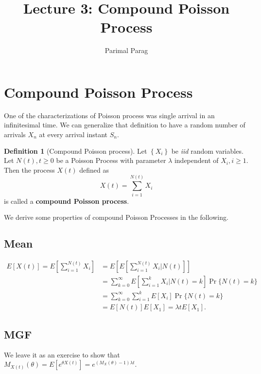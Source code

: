 \documentclass[a4paper,10pt]{article}
\date{}
\title{Lecture 3:  Compound Poisson Process}
\author{Parimal Parag}
\theoremstyle{plain}
\theoremstyle{definition}
\newtheorem{defn}[thm]{Definition}
\begin{document}
\maketitle

\section{Compound Poisson Process}
One of the characterizations of Poisson process was single arrival in an infinitesimal time. We can generalize that definition to have a random number of arrivals $X_n$ at every arrival instant $S_n$.
\begin{defn}[Compound Poisson process] Let $\left\{X_i\right\}$ be \emph{iid} random variables. Let $N(t), t\geq 0$ be a Poisson Process with parameter $\lambda$ independent of $X_i, i\geq 1$. Then the process $X(t)$ defined as
\begin{equation*}
X(t) = \sum_{i=1}^{N(t)} X_i
\end{equation*}
is called a \textbf{compound Poisson process}.
\end{defn}
We derive some properties of compound Poisson Processes in the following.
\subsection{Mean}
\begin{align*}
E[X(t)] = E[\sum_{i=1}^{N(t)} X_i] &= E[E[\sum_{i=1}^{N(t)} X_i|N(t)]] \\
&= \sum_{k=0}^\infty E\left[\sum_{i=1}^{k} X_i|N(t)=k\right]\Pr\{N(t) = k\}\\
&= \sum_{k=0}^\infty \sum_{i=1}^{k} E[X_i]\Pr\{N(t) = k\}\\
&= E[N(t)]E[X_1] = \lambda tE[X_1].
\end{align*}

\subsection{MGF}
We leave it as an exercise to show that $M_{X(t)}(\theta)=E[e^{\theta X(t)}] = e^{(M_X(\theta)-1)\lambda t}$.
\end{document}

